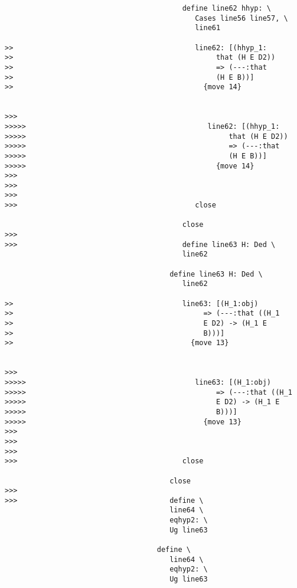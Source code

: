 \documentclass[12pt]{article}
\begin{document}
\begin{verbatim}
                                          define line62 hhyp: \
                                             Cases line56 line57, \
                                             line61

>>                                           line62: [(hhyp_1:
>>                                                that (H E D2))
>>                                                => (---:that
>>                                                (H E B))]
>>                                             {move 14}


>>>
>>>>>                                           line62: [(hhyp_1:
>>>>>                                                that (H E D2))
>>>>>                                                => (---:that
>>>>>                                                (H E B))]
>>>>>                                             {move 14}
>>>
>>>
>>>
>>>                                          close

                                          close
>>>
>>>                                       define line63 H: Ded \
                                          line62

                                       define line63 H: Ded \
                                          line62

>>                                        line63: [(H_1:obj)
>>                                             => (---:that ((H_1
>>                                             E D2) -> (H_1 E
>>                                             B)))]
>>                                          {move 13}


>>>
>>>>>                                        line63: [(H_1:obj)
>>>>>                                             => (---:that ((H_1
>>>>>                                             E D2) -> (H_1 E
>>>>>                                             B)))]
>>>>>                                          {move 13}
>>>
>>>
>>>
>>>                                       close

                                       close
>>>
>>>                                    define \
                                       line64 \
                                       eqhyp2: \
                                       Ug line63

                                    define \
                                       line64 \
                                       eqhyp2: \
                                       Ug line63



\end{verbatim}
\end{document}
